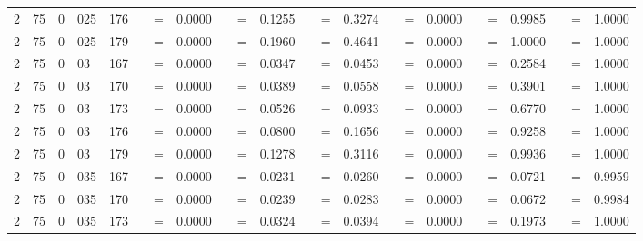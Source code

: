 \begin{tabular*}{260mm}{r@{.}lr@{.}lc|ccc:ccc:ccc:ccc:ccc|ccc}
		2&75	&	0&025	&	176	&	\nicefrac{}{} &=& 0.0000 & 	 &=& 0.1255 & 	 &=& 0.3274 & 	\nicefrac{}{} &=& 0.0000 & 	 &=& 0.9985 & 	 &=& 1.0000 \\ 
		2&75	&	0&025	&	179	&	\nicefrac{}{} &=& 0.0000 & 	 &=& 0.1960 & 	 &=& 0.4641 & 	\nicefrac{}{} &=& 0.0000 & 	 &=& 1.0000 & 	 &=& 1.0000 \\ 
		2&75	&	0&03	&	167	&	\nicefrac{}{} &=& 0.0000 & 	 &=& 0.0347 & 	 &=& 0.0453 & 	\nicefrac{}{} &=& 0.0000 & 	 &=& 0.2584 & 	 &=& 1.0000 \\ 
		2&75	&	0&03	&	170	&	\nicefrac{}{} &=& 0.0000 & 	 &=& 0.0389 & 	 &=& 0.0558 & 	\nicefrac{}{} &=& 0.0000 & 	 &=& 0.3901 & 	 &=& 1.0000 \\ 
		2&75	&	0&03	&	173	&	\nicefrac{}{} &=& 0.0000 & 	 &=& 0.0526 & 	 &=& 0.0933 & 	\nicefrac{}{} &=& 0.0000 & 	 &=& 0.6770 & 	 &=& 1.0000 \\ 
		2&75	&	0&03	&	176	&	\nicefrac{}{} &=& 0.0000 & 	 &=& 0.0800 & 	 &=& 0.1656 & 	\nicefrac{}{} &=& 0.0000 & 	 &=& 0.9258 & 	 &=& 1.0000 \\ 
		2&75	&	0&03	&	179	&	\nicefrac{}{} &=& 0.0000 & 	 &=& 0.1278 & 	 &=& 0.3116 & 	\nicefrac{}{} &=& 0.0000 & 	 &=& 0.9936 & 	 &=& 1.0000 \\ 
		2&75	&	0&035	&	167	&	\nicefrac{}{} &=& 0.0000 & 	 &=& 0.0231 & 	 &=& 0.0260 & 	\nicefrac{}{} &=& 0.0000 & 	 &=& 0.0721 & 	 &=& 0.9959 \\ 
		2&75	&	0&035	&	170	&	\nicefrac{}{} &=& 0.0000 & 	 &=& 0.0239 & 	 &=& 0.0283 & 	\nicefrac{}{} &=& 0.0000 & 	 &=& 0.0672 & 	 &=& 0.9984 \\ 
		2&75	&	0&035	&	173	&	\nicefrac{}{} &=& 0.0000 & 	 &=& 0.0324 & 	 &=& 0.0394 & 	\nicefrac{}{} &=& 0.0000 & 	 &=& 0.1973 & 	 &=& 1.0000 \\ 

\end{tabular*}
